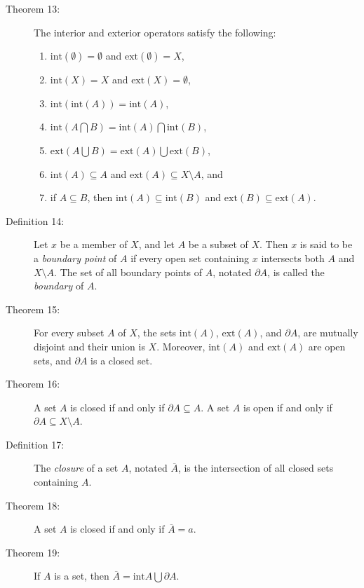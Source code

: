\documentclass{article}
\begin{document}
\begin{description}
  \item[Theorem 13:] The interior and exterior operators satisfy the following:
    \begin{enumerate}[\hspace{1cm}1.]
      \item $\text{int} (\emptyset) = \emptyset$ and $\text{ext} (\emptyset) = X$,
      \item $\text{int} (X) = X$ and $\text{ext} (X) = \emptyset$,
      \item $\text{int} (\text{int} (A)) = \text{int} (A)$,
      \item $\text{int} (A \bigcap B) = \text{int} (A) \bigcap \text{int} (B)$,
      \item $\text{ext} (A \bigcup B) = \text{ext} (A) \bigcup \text{ext} (B)$,
      \item $\text{int} (A) \subseteq A$ and $\text{ext} (A) \subseteq X \setminus A$, and
      \item if $A \subseteq B$, then $\text{int} (A) \subseteq \text{int} (B)$ and $\text{ext} (B) \subseteq \text{ext} (A)$.
    \end{enumerate}

  \item[Definition 14:] Let $x$ be a member of $X$, and let $A$ be a subset of $X$. Then $x$ is said to be a \emph{boundary point} of $A$ if every open set containing $x$ intersects both $A$ and $X \setminus A$. The set of all boundary points of $A$, notated $\partial A$, is called the \emph{boundary} of $A$.

  \item[Theorem 15:] For every subset $A$ of $X$, the sets $\text{int} (A)$, $\text{ext} (A)$, and $\partial A$, are mutually disjoint and their union is $X$. Moreover, $\text{int} (A)$ and $\text{ext} (A)$ are open sets, and $\partial A$ is a closed set.

  \item[Theorem 16:] A set $A$ is closed if and only if $\partial A \subseteq A$. A set $A$ is open if and only if $\partial A \subseteq X \setminus A$.

  \item[Definition 17:] The \emph{closure} of a set $A$, notated $\overline{A}$, is the intersection of all closed sets containing $A$.

  \item[Theorem 18:] A set $A$ is closed if and only if $\overline{A}=a$.

  \item[Theorem 19:] If $A$ is a set, then $\overline{A} = \text{int} A \bigcup \partial A$.


\end{description}
\end{document}
